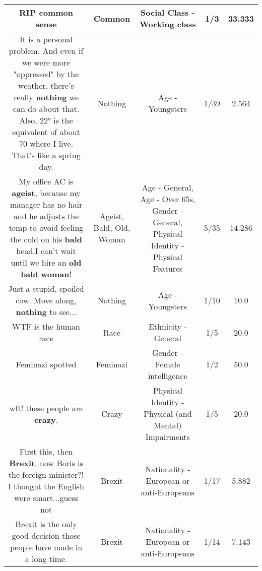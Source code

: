 \documentclass[11pt]{article}
\newlength\mylength
\begin{document}
\begin{center}
\begin{longtable}{|C{.65\mylength}|C{.30\mylength}|C{.12\mylength}|C{.12\mylength}|C{.12\mylength}|}
  \small RIP \textbf{common} sense\normalsize   & Common & Social Class - Working class & 1/3 & 33.333 \\  \hline
  \small It is a personal problem. And even if we were more "oppressed" by the weather, there's really \textbf{nothing} we can do about that. Also, 22° is the equivalent of about 70 where I live. That's like a spring day.\normalsize   & Nothing & Age - Youngsters & 1/39 & 2.564 \\  \hline
  \small My office AC is \textbf{ageist}, because my manager has no hair and he adjusts the temp to avoid feeling the cold on his \textbf{bald} head.I can't wait until we hire an \textbf{old} \textbf{bald} \textbf{woman}!\normalsize   & Ageist, Bald, Old, Woman & Age - General, Age - Over 65s, Gender - General, Physical Identity - Physical Features & 5/35 & 14.286 \\  \hline
  \small Just a stupid, spoiled cow. Move along, \textbf{nothing} to see...\normalsize   & Nothing & Age - Youngsters & 1/10 & 10.0 \\  \hline
  \small WTF is the human race\normalsize   & Race & Ethnicity - General & 1/5 & 20.0 \\  \hline
  \small Feminazi spotted\normalsize   & Feminazi & Gender - Female intelligence & 1/2 & 50.0 \\  \hline
  \small wft! these people are \textbf{crazy}.\normalsize   & Crazy & Physical Identity - Physical (and Mental) Impairments & 1/5 & 20.0 \\  \hline
  \small First this, then \textbf{Brexit}, now Boris is the foreign minister?! I thought the English were smart...guess not\normalsize   & Brexit & Nationality - European or anti-Europeans & 1/17 & 5.882 \\  \hline
  \small Brexit is the only good decision those people have made in a long time.\normalsize   & Brexit & Nationality - European or anti-Europeans & 1/14 & 7.143 \\  \hline

\end{longtable}
\end{center}
\end{document}
